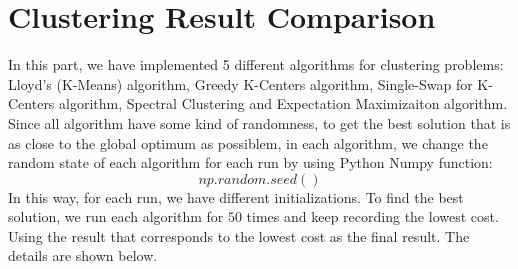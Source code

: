 

\usepackage{graphicx, amssymb, amsmath, listings, float, mathtools}
\usepackage{color, url}
\usepackage{romannum}
\usepackage{subcaption}
\usepackage{mwe}
\lstset{language = Python}
\lstset{breaklines}
\lstset{extendedchars=false}
 
 
 
\lstset{style=mystyle}

\oddsidemargin 0in
\evensidemargin 0in
\textwidth 6.5in
\topmargin -0.6in
\textheight 9.0in



\section{\Large Clustering Result Comparison}

In this part, we have implemented 5 different algorithms for clustering problems: Lloyd's (K-Means) algorithm, Greedy K-Centers algorithm, Single-Swap for K-Centers algorithm, Spectral Clustering and Expectation Maximizaiton algorithm. Since all algorithm have some kind of randomness, to get the best solution that is as close to the global optimum as possiblem, in each algorithm, we change the random state of each algorithm for each run by using Python Numpy function: 
    $$np.random.seed()$$
In this way, for each run, we have different initializations. To find the best solution, we run each algorithm for $50$ times and keep recording the lowest cost. Using the result that corresponds to the lowest cost as the final result.  The details are shown below.

